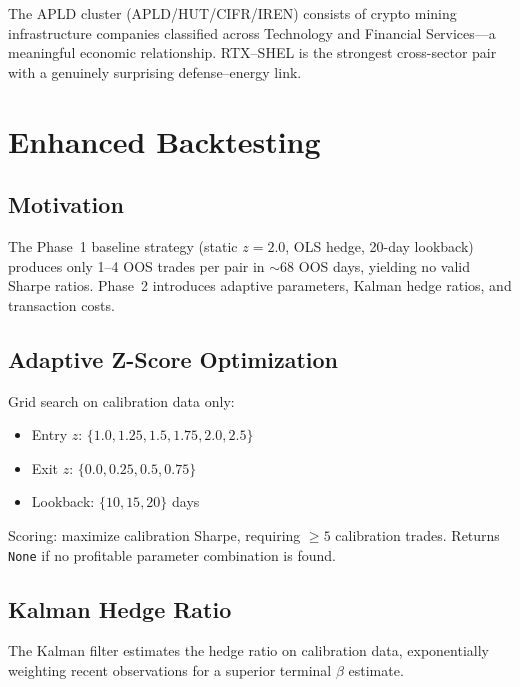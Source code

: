 \documentclass[11pt, a4paper]{article}
\begin{document}
The APLD cluster (APLD/HUT/CIFR/IREN) consists of crypto mining infrastructure companies classified across Technology and Financial Services---a meaningful economic relationship. RTX--SHEL is the strongest cross-sector pair with a genuinely surprising defense--energy link.

\section{Enhanced Backtesting}

\subsection{Motivation}

The Phase~1 baseline strategy (static $z = 2.0$, OLS hedge, 20-day lookback) produces only 1--4 OOS trades per pair in $\sim$68 OOS days, yielding no valid Sharpe ratios. Phase~2 introduces adaptive parameters, Kalman hedge ratios, and transaction costs.

\subsection{Adaptive Z-Score Optimization}

Grid search on calibration data only:

\begin{itemize}
    \item Entry $z$: $\{1.0, 1.25, 1.5, 1.75, 2.0, 2.5\}$
    \item Exit $z$: $\{0.0, 0.25, 0.5, 0.75\}$
    \item Lookback: $\{10, 15, 20\}$ days
\end{itemize}

Scoring: maximize calibration Sharpe, requiring $\geq 5$ calibration trades. Returns \texttt{None} if no profitable parameter combination is found.

\subsection{Kalman Hedge Ratio}

The Kalman filter \cite{kalman1960} estimates the hedge ratio on calibration data, exponentially weighting recent observations for a superior terminal $\beta$ estimate.
\end{document}
